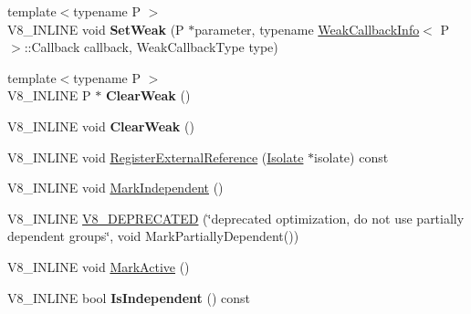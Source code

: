 \begin{DoxyCompactItemize}
\item 
{\footnotesize template$<$typename P $>$ }\\V8\+\_\+\+I\+N\+L\+I\+NE void {\bfseries Set\+Weak} (P $\ast$parameter, typename \hyperlink{classv8_1_1_weak_callback_info}{Weak\+Callback\+Info}$<$ P $>$\+::Callback callback, Weak\+Callback\+Type type)\hypertarget{classv8_1_1_persistent_base_aebb8a2c97e219102f613ff3749c956f6}{}\label{classv8_1_1_persistent_base_aebb8a2c97e219102f613ff3749c956f6}

\item 
{\footnotesize template$<$typename P $>$ }\\V8\+\_\+\+I\+N\+L\+I\+NE P $\ast$ {\bfseries Clear\+Weak} ()\hypertarget{classv8_1_1_persistent_base_a444d27c00650e3663348024df08cb121}{}\label{classv8_1_1_persistent_base_a444d27c00650e3663348024df08cb121}

\item 
V8\+\_\+\+I\+N\+L\+I\+NE void {\bfseries Clear\+Weak} ()\hypertarget{classv8_1_1_persistent_base_afe515daead108cceb1699b54051df13b}{}\label{classv8_1_1_persistent_base_afe515daead108cceb1699b54051df13b}

\item 
V8\+\_\+\+I\+N\+L\+I\+NE void \hyperlink{classv8_1_1_persistent_base_a14c051e0080bbe7fbe02be35865b9923}{Register\+External\+Reference} (\hyperlink{classv8_1_1_isolate}{Isolate} $\ast$isolate) const 
\item 
V8\+\_\+\+I\+N\+L\+I\+NE void \hyperlink{classv8_1_1_persistent_base_aed12b0a54bc5ade1fb44e3bdb3a1fe74}{Mark\+Independent} ()
\item 
V8\+\_\+\+I\+N\+L\+I\+NE \hyperlink{classv8_1_1_persistent_base_af18132d6f1472d42d101b1bb410505cb}{V8\+\_\+\+D\+E\+P\+R\+E\+C\+A\+T\+ED} (\char`\"{}deprecated optimization, do not use partially dependent groups\char`\"{}, void Mark\+Partially\+Dependent())
\item 
V8\+\_\+\+I\+N\+L\+I\+NE void \hyperlink{classv8_1_1_persistent_base_a7244edd33a45b7d95e566fce85e3f87d}{Mark\+Active} ()
\item 
V8\+\_\+\+I\+N\+L\+I\+NE bool {\bfseries Is\+Independent} () const \hypertarget{classv8_1_1_persistent_base_a2ed93b6be1b27c299906935ef35d2114}{}\label{classv8_1_1_persistent_base_a2ed93b6be1b27c299906935ef35d2114}


\end{DoxyCompactItemize}

